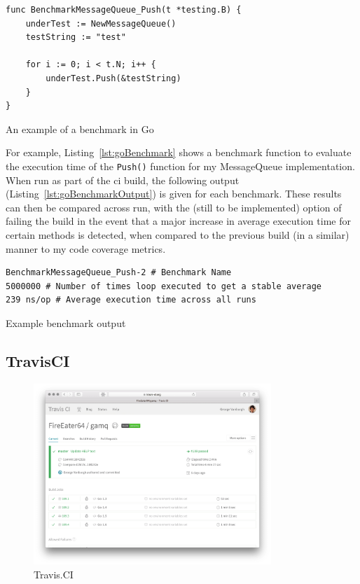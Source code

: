 \begin{listing}
  \centering
  \begin{verbatim}
func BenchmarkMessageQueue_Push(t *testing.B) {
	underTest := NewMessageQueue()
	testString := "test"

	for i := 0; i < t.N; i++ {
		underTest.Push(&testString)
	}
}
  \end{verbatim}
  \caption{An example of a benchmark in Go}
  \label{lst:goBenchmark}
\end{listing}

For example, Listing~\ref{lst:goBenchmark} shows a benchmark function to
evaluate the execution time of the \texttt{Push()} function for my
MessageQueue implementation. When run as part of the \gls{ci} build, the
following output (Listing~\ref{lst:goBenchmarkOutput}) is given for each
benchmark. These results can then be compared across run, with the (still to be
implemented) option of failing the build in the event that a major increase in
average execution time for certain methods is detected, when compared to the
previous build (in a similar) manner to my code coverage metrics.

\begin{listing}
  \centering
  \begin{verbatim}
BenchmarkMessageQueue_Push-2 # Benchmark Name
5000000 # Number of times loop executed to get a stable average
239 ns/op # Average execution time across all runs
  \end{verbatim}
  \caption{Example benchmark output}
  \label{lst:goBenchmarkOutput}
\end{listing}


\subsection{TravisCI}
\label{sub:TravisCI}

\begin{figure}[H]
  \includegraphics[width=0.8\textwidth]{figures/travisScreenshot}
  \centering
  \caption{Travis.CI}
  \label{fig:travisCI}
\end{figure}

